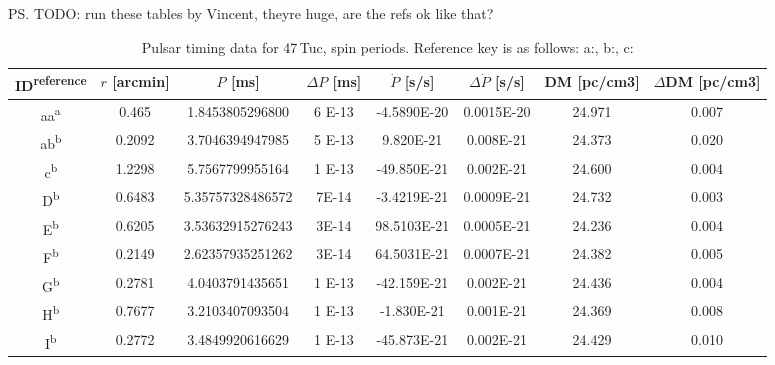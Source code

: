 \ps{TODO: run these tables by Vincent, theyre huge, are the refs ok like that?}
\begin{table}
    \centering
    \caption{Pulsar timing data for 47\,Tuc, spin periods. Reference key is as follows:
        a:\citet{Freire2018}, b:\citet{Freire2017}, c:\citet{Ridolfi2016}}

    \begin{tabular}{c c c c c c c c}
        \hline

        ID\textsuperscript{reference} & $r$ [arcmin] & $P$ [ms]         & $\Delta P$ [ms] & $\dot{P}$ [s/s]     & $\Delta \dot{P}$ [s/s] & DM [pc/cm3] & $\Delta$DM [pc/cm3] \\
        \hline
        aa\textsuperscript{a}         & 0.465        & 1.8453805296800  & \num{6 E-13}    & \num{-4.5890E-20}   & \num{0.0015E-20}       & 24.971      & 0.007               \\
        ab\textsuperscript{b}         & 0.2092       & 3.7046394947985  & \num{5 E-13}    & \num{9.820E-21}     & \num{0.008E-21}        & 24.373      & 0.020               \\
        c\textsuperscript{b}          & 1.2298       & 5.7567799955164  & \num{1 E-13}    & \num{-49.850E-21}   & \num{0.002E-21}        & 24.600      & 0.004               \\
        D\textsuperscript{b}          & 0.6483       & 5.35757328486572 & \num{7E-14}     & \num{-3.4219E-21}   & \num{0.0009E-21}       & 24.732      & 0.003               \\
        E\textsuperscript{b}          & 0.6205       & 3.53632915276243 & \num{3E-14}     & \num{98.5103E-21}   & \num{0.0005E-21}       & 24.236      & 0.004               \\
        F\textsuperscript{b}          & 0.2149       & 2.62357935251262 & \num{3E-14}     & \num{64.5031E-21}   & \num{0.0007E-21}       & 24.382      & 0.005               \\
        G\textsuperscript{b}          & 0.2781       & 4.0403791435651  & \num{1 E-13}    & \num{-42.159E-21}   & \num{0.002E-21}        & 24.436      & 0.004               \\
        H\textsuperscript{b}          & 0.7677       & 3.2103407093504  & \num{1 E-13}    & \num{-1.830E-21}    & \num{0.001E-21}        & 24.369      & 0.008               \\
        I\textsuperscript{b}          & 0.2772       & 3.4849920616629  & \num{1 E-13}    & \num{-45.873E-21}   & \num{0.002E-21}        & 24.429      & 0.010               \\

\end{tabular}
\end{table}
